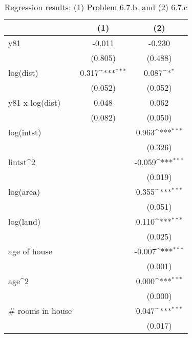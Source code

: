 \begin{table}[htbp]\centering
\def\sym#1{\ifmmode^{#1}\else\(^{#1}\)\fi}
\caption{Regression results: (1) Problem 6.7.b. and (2) 6.7.c}
\begin{tabular}{l*{2}{c}}
\toprule
                    &\multicolumn{1}{c}{(1)}         &\multicolumn{1}{c}{(2)}         \\
\midrule
y81                 &      -0.011         &      -0.230         \\
                    &     (0.805)         &     (0.488)         \\
\addlinespace
log(dist)           &       0.317\sym{***}&       0.087\sym{*}  \\
                    &     (0.052)         &     (0.052)         \\
\addlinespace
y81 x log(dist)     &       0.048         &       0.062         \\
                    &     (0.082)         &     (0.050)         \\
\addlinespace
log(intst)          &                     &       0.963\sym{***}\\
                    &                     &     (0.326)         \\
\addlinespace
lintst^2            &                     &      -0.059\sym{***}\\
                    &                     &     (0.019)         \\
\addlinespace
log(area)           &                     &       0.355\sym{***}\\
                    &                     &     (0.051)         \\
\addlinespace
log(land)           &                     &       0.110\sym{***}\\
                    &                     &     (0.025)         \\
\addlinespace
age of house        &                     &      -0.007\sym{***}\\
                    &                     &     (0.001)         \\
\addlinespace
age^2               &                     &       0.000\sym{***}\\
                    &                     &     (0.000)         \\
\addlinespace
# rooms in house    &                     &       0.047\sym{***}\\
                    &                     &     (0.017)         \\

\end{tabular}
\end{table}
